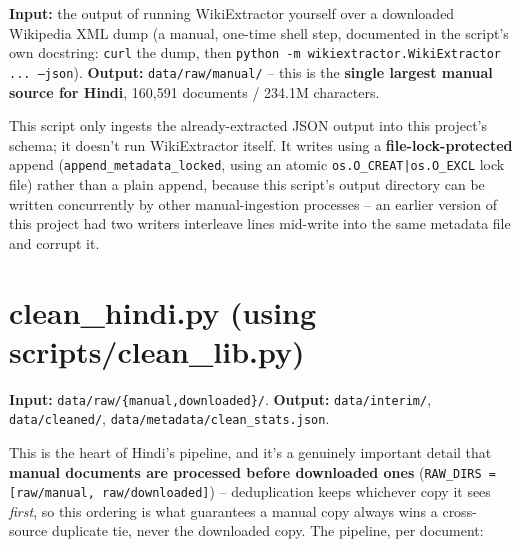 \documentclass[11pt]{report}
\begin{document}
\textbf{Input:} the output of running WikiExtractor yourself over a
downloaded Wikipedia XML dump (a manual, one-time shell step, documented
in the script's own docstring: \texttt{curl} the dump, then
\texttt{python -m wikiextractor.WikiExtractor ... --json}).
\textbf{Output:} \texttt{data/raw/manual/} -- this is the
\textbf{single largest manual source for Hindi}, 160,591 documents / 234.1M
characters.

This script only ingests the already-extracted JSON output into this
project's schema; it doesn't run WikiExtractor itself. It writes using a
\textbf{file-lock-protected} append (\texttt{append\_metadata\_locked},
using an atomic \texttt{os.O\_CREAT|os.O\_EXCL} lock file) rather than a
plain append, because this script's output directory can be written
concurrently by other manual-ingestion processes -- an earlier version of
this project had two writers interleave lines mid-write into the same
metadata file and corrupt it.

\section{clean\_hindi.py (using scripts/clean\_lib.py)}
\label{sec:clean-hindi}

\textbf{Input:} \texttt{data/raw/\{manual,downloaded\}/}.
\textbf{Output:} \texttt{data/interim/}, \texttt{data/cleaned/},
\texttt{data/metadata/clean\_stats.json}.

This is the heart of Hindi's pipeline, and it's a genuinely important
detail that \textbf{manual documents are processed before downloaded
ones} (\texttt{RAW\_DIRS = [raw/manual, raw/downloaded]}) --
deduplication keeps whichever copy it sees \textit{first}, so this
ordering is what guarantees a manual copy always wins a cross-source
duplicate tie, never the downloaded copy. The pipeline, per document:
\end{document}
